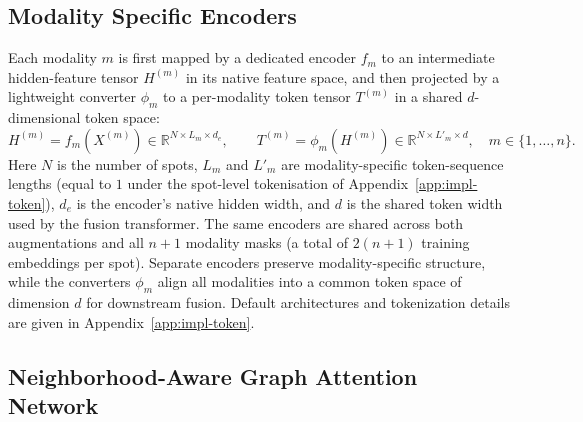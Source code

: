 \documentclass{article}
\theoremstyle{plain}
\theoremstyle{definition}
\begin{document}
\subsection{Modality Specific Encoders}
\label{subsec:modality-encoders}
Each modality $m$ is first mapped by a dedicated encoder $f_m$ to an intermediate hidden-feature tensor $H^{(m)}$ in its native feature space, and then projected by a lightweight converter $\phi_m$ to a per-modality token tensor $T^{(m)}$ in a shared $d$-dimensional token space:
\begin{equation}
  H^{(m)} = f_m(X^{(m)}) \in \mathbb{R}^{N \times L_m \times d_e},
  \qquad
  T^{(m)} = \phi_m(H^{(m)}) \in \mathbb{R}^{N \times L'_m \times d},
  \quad m \in \{1, \ldots, n\}.
\end{equation}
Here $N$ is the number of spots, $L_m$ and $L'_m$ are modality-specific token-sequence lengths (equal to $1$ under the spot-level tokenisation of Appendix~\ref{app:impl-token}), $d_e$ is the encoder's native hidden width, and $d$ is the shared token width used by the fusion transformer. The same encoders are shared across both augmentations and all $n+1$ modality masks (a total of $2(n+1)$ training embeddings per spot). Separate encoders preserve modality-specific structure, while the converters $\phi_m$ align all modalities into a common token space of dimension $d$ for downstream fusion. Default architectures and tokenization details are given in Appendix~\ref{app:impl-token}.

\subsection{Neighborhood-Aware Graph Attention Network}
\label{subsec:neighgat}
\end{document}
